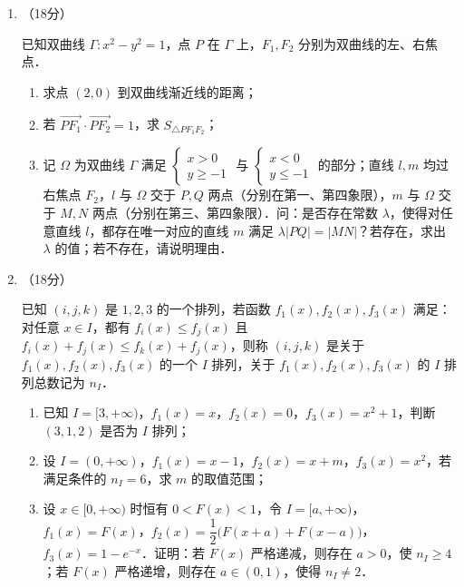 \begin{description}
\begin{enumerate}[leftmargin=5pt]
        已知函数 $f(x)=x^2+ax+3$，$g(x)=4x+\dfrac{1}{x^2}$．

        \begin{enumerate}[label=(\arabic*)]
            \item 解不等式：$f(x)+\dfrac{1}{x^2}>g(x)$；
            \item 设直线 $l_1$ 为 $f(x)$ 过点 $(0,3)$ 的切线，直线 $l_2\perp l_1$ 且也过点 $(0,3)$．若 $l_1,l_2$ 与 $g(x)$ 在第一象限内无交点，求实数 $a$ 的取值范围．
        \end{enumerate}

        \item （18分）

        已知双曲线 $\Gamma:x^2-y^2=1$，点 $P$ 在 $\Gamma$ 上，$F_1,F_2$ 分别为双曲线的左、右焦点．

        \begin{enumerate}[label=(\arabic*)]
            \item 求点 $(2,0)$ 到双曲线渐近线的距离；
            \item 若 $\overrightarrow{PF_1}\cdot\overrightarrow{PF_2}=1$，求 $S_{\triangle PF_1F_2}$；
            \item 记 $\Omega$ 为双曲线 $\Gamma$ 满足 $\begin{cases}x>0 \\ y\geqslant-1\end{cases}$ 与 $\begin{cases}x<0 \\ y\leqslant-1\end{cases}$ 的部分；直线 $l,m$ 均过右焦点 $F_2$，$l$ 与 $\Omega$ 交于 $P,Q$ 两点（分别在第一、第四象限），$m$ 与 $\Omega$ 交于 $M,N$ 两点（分别在第三、第四象限）．问：是否存在常数 $\lambda$，使得对任意直线 $l$，都存在唯一对应的直线 $m$ 满足 $\lambda|PQ|=|MN|$？若存在，求出 $\lambda$ 的值；若不存在，请说明理由．
        \end{enumerate}

        \item （18分）

        已知 $(i,j,k)$ 是 $1,2,3$ 的一个排列，若函数 $f_1(x),f_2(x),f_3(x)$ 满足：对任意 $x\in I$，都有 $f_i(x)\leqslant f_j(x)$ 且 $f_i(x)+f_j(x)\leqslant f_k(x)+f_j(x)$，则称 $(i,j,k)$ 是关于 $f_1(x),f_2(x),f_3(x)$ 的一个 $I$ 排列，关于 $f_1(x),f_2(x),f_3(x)$ 的 $I$ 排列总数记为 $n_I$．

        \begin{enumerate}[label=(\arabic*)]
            \item 已知 $I=[3,+\infty)$，$f_1(x)=x$，$f_2(x)=0$，$f_3(x)=x^2+1$，判断 $(3,1,2)$ 是否为 $I$ 排列；
            \item 设 $I=(0,+\infty)$，$f_1(x)=x-1$，$f_2(x)=x+m$，$f_3(x)=x^2$，若满足条件的 $n_I=6$，求 $m$ 的取值范围；
            \item 设 $x\in[0,+\infty)$ 时恒有 $0<F(x)<1$，令 $I=[a,+\infty)$，$f_1(x)=F(x)$，$f_2(x)=\dfrac{1}{2}\bigl(F(x+a)+F(x-a)\bigr)$，$f_3(x)=1-e^{-x}$．证明：若 $F(x)$ 严格递减，则存在 $a>0$，使 $n_I\geqslant4$；若 $F(x)$ 严格递增，则存在 $a\in(0,1)$，使得 $n_I\neq2$．
        \end{enumerate}
    \end{enumerate}
\end{description}
